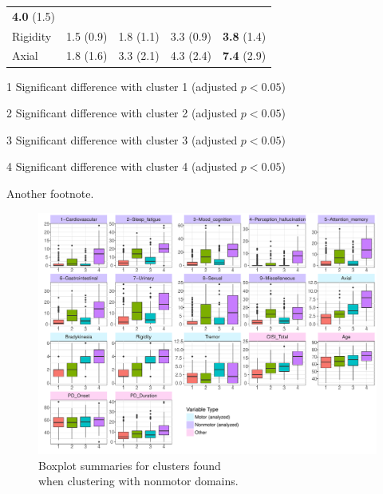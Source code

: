 \documentclass[preprint,3p,twocolumn]{elsarticle} %
\begin{document}
\begin{table}[t]
\begin{threeparttable}
\begin{tabular}{l r r r r}
    \textbf{4.0} (1.5)\tnote{123} \\
    Rigidity & 1.5 (0.9)\tnote{234} & 1.8 (1.1)\tnote{134} & 3.3 (0.9)\tnote{124} &
    \textbf{3.8} (1.4)\tnote{123} \\
    Axial & 1.8 (1.6)\tnote{234} & 3.3 (2.1)\tnote{134} & 4.3 (2.4)\tnote{124} &
    \textbf{7.4} (2.9)\tnote{123} \\
    \bottomrule
  \end{tabular}
  \begin{tablenotes}
    \small
    \item[1] Significant difference with cluster 1 (adjusted $p < 0.05$)
    \item[2] Significant difference with cluster 2 (adjusted $p < 0.05$)
    \item[3] Significant difference with cluster 3 (adjusted $p < 0.05$)
    \item[4] Significant difference with cluster 4 (adjusted $p < 0.05$)
    \item[\textdagger] Another footnote.
  \end{tablenotes}
  \end{threeparttable}
\end{table}

\begin{figure}[b]
  \centering
  \includegraphics[width=\linewidth]{kmeans-summaries-4-pub.pdf}
  \vspace{-7.5em}
  \captionsetup{justification=raggedleft,
    singlelinecheck=false
  }
  \caption{Boxplot summaries for clusters found \\ when clustering with nonmotor domains.}
  \label{fig:box}
\end{figure}
\end{document}
